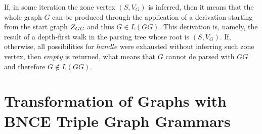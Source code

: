 \documentclass[]{report}
\begin{document}
If, in some iteration the zone vertex $(S, V_G)$ is inferred, then it means that the whole graph $G$ can be produced through the application of a derivation starting from the start graph $Z_{GG}$ and thus $G \in L(GG)$. This derivation is, namely, the result of a depth-first walk in the parsing tree whose root is $(S, V_G)$. If, otherwise, all possibilities for $handle$ were exhausted without inferring such zone vertex, then $empty$ is returned, what means that $G$ cannot de parsed with $GG$ and therefore $G \notin L(GG)$.




\section{Transformation of Graphs with BNCE Triple Graph Grammars}
\end{document}
